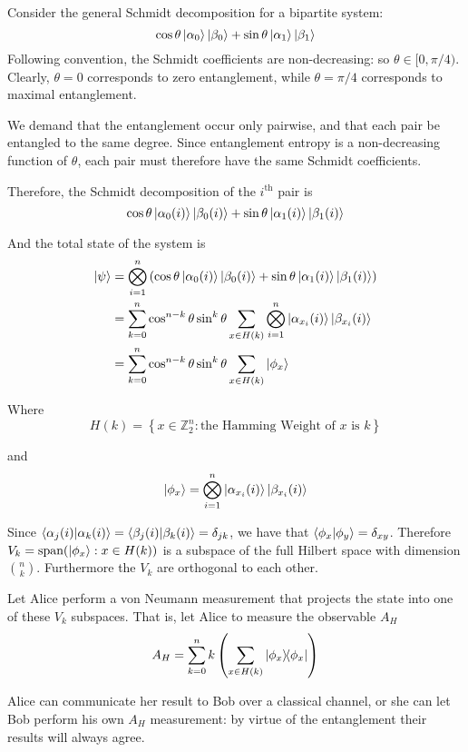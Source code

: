 \newcommand{\ZZ}{\mathbb{Z}} %
\newcommand{\vspan}{\text{span}} %
%
%
Consider the general Schmidt decomposition for a bipartite system:
$$
\cos\theta \ket{\alpha_0} \ket{\beta_0} + 
\sin\theta \ket{\alpha_1} \ket{\beta_1}
$$
Following convention, the Schmidt coefficients are non-decreasing: so $\theta \in [0, \pi/4)$. Clearly, $\theta = 0$ corresponds to zero entanglement, while $\theta = \pi/4$ corresponds to maximal entanglement.

We demand that the entanglement occur only pairwise, and that each pair be entangled to the same degree. Since entanglement entropy is a non-decreasing function of $\theta$, each pair must therefore have the same Schmidt coefficients.

Therefore, the Schmidt decomposition of the $i^{\text{th}}$ pair is  
$$
\cos\theta \ket{\alpha_0(i)} \ket{\beta_0(i)} + 
\sin\theta \ket{\alpha_1(i)} \ket{\beta_1(i)}
$$

And the total state of the system is
\begin{align}
	\ket{\psi} &= \bigotimes_{i=1}^n \left( 
	\cos\theta \ket{\alpha_0(i)} \ket{\beta_0(i)} + 
	\sin\theta \ket{\alpha_1(i)} \ket{\beta_1(i)} \right) \\
	&= \sum_{k=0}^n \cos^{n-k}\theta \sin^k\theta
	\sum_{x \in H(k)} \bigotimes_{i=1}^n 
	\ket{\alpha_{x_i}(i)} \ket{\beta_{x_i}(i)} \\
	&=  \sum_{k=0}^n \cos^{n-k}\theta \sin^k\theta
	\sum_{x \in H(k)} \ket{\phi_x}
\end{align}

Where 
$$
H(k) = \left\{ 
x \in \ZZ_2^n : \text{the Hamming Weight of $x$ is $k$} 
\right\}
$$

and
$$
\ket{\phi_x} = \bigotimes_{i=1}^n 
\ket{\alpha_{x_i}(i)} \ket{\beta_{x_i}(i)}
$$


Since $ \braket{\alpha_j(i)}{\alpha_k(i)} = \braket{\beta_j(i)}{\beta_k(i)} = \delta_{jk} $, we have that $\braket{\phi_x}{\phi_y} = \delta_{xy}$.
Therefore $V_k = \vspan(\ket{\phi_x} : x \in H(k))$ is a subspace of the full Hilbert space with dimension $\binom{n}{k}$.
Furthermore the $V_k$ are orthogonal to each other.

Let Alice perform a von Neumann measurement that projects the state into one of these $V_k$ subspaces. That is, let Alice to measure the observable $A_H$
$$
A_H = \sum_{k=0}^n k \left( \sum_{x \in H(k)}  \dyad{\phi_x}{\phi_x} \right) 
$$

Alice can communicate her result to Bob over a classical channel, or she can let Bob perform his own $A_H$ measurement: by virtue of the entanglement their results will always agree.

